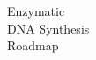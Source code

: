 \begin{titlepage}
    \thispagestyle{empty}

    \begin{flushleft}
        {   
            \fontsize{60pt}{60pt}
            \selectfont
            {Enzymatic}\\
            {DNA Synthesis}\\
            {Roadmap}
        }   
        \vfill
    \end{flushleft}
\end{titlepage}

\setcounter{page}{2}
